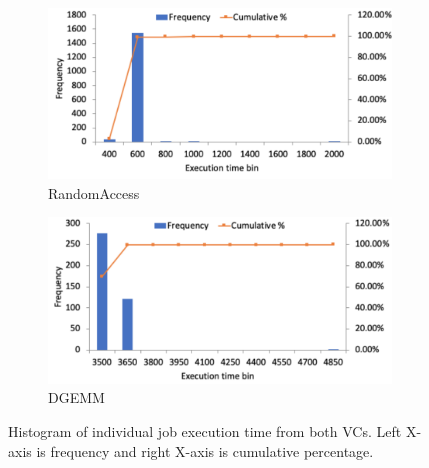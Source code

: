 \begin{figure}
     \centering
     \begin{subfigure}[b]{0.48\textwidth}
         \centering
         \includegraphics[width=\textwidth]{Figures/ra_histogram.pdf}
         \caption{RandomAccess}
         \label{fig:ra_histogram}
     \end{subfigure}
     \hfill
     \begin{subfigure}[b]{0.48\textwidth}
         \centering
         \includegraphics[width=\textwidth]{Figures/dgemm_histogram.pdf}
         \caption{DGEMM}
         \label{fig:dgemm_histogram}
     \end{subfigure}
     \caption{Histogram of individual job execution time from both VCs. Left X-axis is frequency and right X-axis is cumulative percentage.}
     \label{fig:histogram}
\end{figure}




